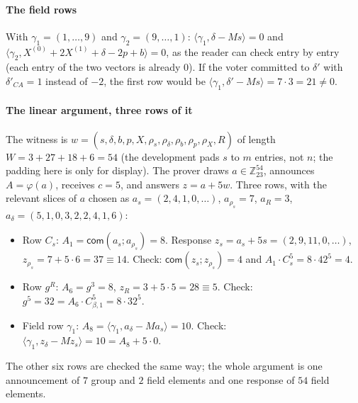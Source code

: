 \documentclass[11pt,a4paper]{article}
\newcommand{\Z}{\mathbb{Z}}
\newcommand{\com}{\mathsf{com}}
\theoremstyle{remark}
\begin{document}
\paragraph{The field rows} With $\gamma_1 = (1, \ldots, 9)$ and $\gamma_2
= (9, \ldots, 1)$: $\langle \gamma_1, \delta - Ms \rangle = 0$ and
$\langle \gamma_2, X^{(0)} + 2 X^{(1)} + \delta - 2p + b \rangle = 0$, as
the reader can check entry by entry (each entry of the two vectors is
already $0$). If the voter committed to $\delta'$ with $\delta'_{CA} = 1$
instead of $-2$, the first row would be $\langle \gamma_1, \delta' - Ms
\rangle = 7 \cdot 3 = 21 \ne 0$.

\paragraph{The linear argument, three rows of it} The witness is $w = (s,
\delta, b, p, X, \rho_s, \rho_\delta, \rho_b, \rho_p, \rho_X, R)$ of
length $W = 3 + 27 + 18 + 6 = 54$ (the development pads $s$ to $m$
entries, not $n$; the padding here is only for display). The prover draws
$a \in \Z_{23}^{54}$, announces $A = \varphi(a)$, receives $c = 5$, and
answers $z = a + 5 w$. Three rows, with the relevant slices of $a$
chosen as $a_s = (2, 4, 1, 0, \ldots)$, $a_{\rho_s} = 7$, $a_R = 3$,
$a_\delta = (5, 1, 0, 3, 2, 2, 4, 1, 6)$:
\begin{itemize}[nosep]
  \item Row $C_s$: $A_1 = \com(a_s; a_{\rho_s}) = 8$. Response $z_s = a_s +
  5 s = (2, 9, 11, 0, \ldots)$, $z_{\rho_s} = 7 + 5 \cdot 6 = 37 \equiv
  14$. Check: $\com(z_s; z_{\rho_s}) = 4$ and $A_1 \cdot C_s^{5} = 8 \cdot
  42^5 = 4$.
  \item Row $g^R$: $A_6 = g^{3} = 8$, $z_R = 3 + 5 \cdot 5 = 28 \equiv 5$.
  Check: $g^{5} = 32 = A_6 \cdot C_{\beta,1}^{5} = 8 \cdot 32^5$.
  \item Field row $\gamma_1$: $A_8 = \langle \gamma_1, a_\delta - M a_s
  \rangle = 10$. Check: $\langle \gamma_1, z_\delta - M z_s \rangle = 10 =
  A_8 + 5 \cdot 0$.
\end{itemize}
The other six rows are checked the same way; the whole argument is one
announcement of $7$ group and $2$ field elements and one response of
$54$ field elements.
\end{document}
